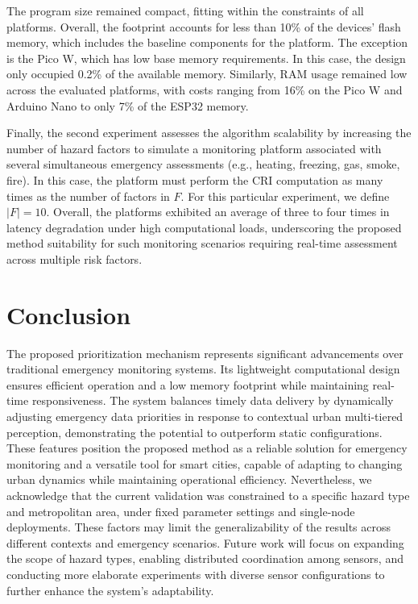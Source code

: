 \documentclass[conference]{IEEEtran}
\begin{document}
The program size remained compact, fitting within the constraints of all platforms. Overall, the footprint accounts for less than 10\% of the devices' flash memory, which includes the baseline components for the platform. The exception is the Pico W, which has low base memory requirements. In this case, the design only occupied 0.2\% of the available memory. Similarly, RAM usage remained low across the evaluated platforms, with costs ranging from 16\% on the Pico W and Arduino Nano to only 7\% of the ESP32 memory.

Finally, the second experiment assesses the algorithm scalability by increasing the number of hazard factors to simulate a monitoring platform associated with several simultaneous emergency assessments (e.g., heating, freezing, gas, smoke, fire). In this case, the platform must perform the CRI computation as many times as the number of factors in \( F \). For this particular experiment, we define \( |F| = 10\).  Overall, the platforms exhibited an average of three to four times in latency degradation under high computational loads, underscoring the proposed method suitability for such monitoring scenarios requiring real-time assessment across multiple risk factors.

\section{Conclusion}
\label{sec:conclusion}
The proposed prioritization mechanism represents significant advancements over traditional emergency monitoring systems. Its lightweight computational design ensures efficient operation and a low memory footprint while maintaining real-time responsiveness. The system balances timely data delivery by dynamically adjusting emergency data priorities in response to contextual urban multi-tiered perception, demonstrating the potential to outperform static configurations. These features position the proposed method as a reliable solution for emergency monitoring and a versatile tool for smart cities, capable of adapting to changing urban dynamics while maintaining operational efficiency. Nevertheless, we acknowledge that the current validation was constrained to a specific hazard type and metropolitan area, under fixed parameter settings and single-node deployments. These factors may limit the generalizability of the results across different contexts and emergency scenarios. %
Future work will focus on expanding the scope of hazard types, enabling distributed coordination among sensors, and conducting more elaborate experiments with diverse sensor configurations to further enhance the system's adaptability.




\end{document}

